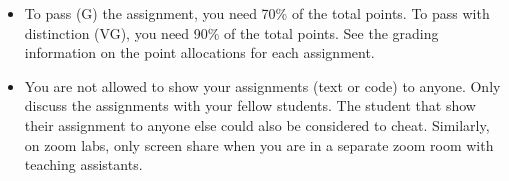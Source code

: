\begin{itemize}
\item To pass (G) the assignment, you need 70\% of the total points. To pass with distinction (VG), you need 90\% of the total points. See the grading information on the point allocations for each assignment.
\item You are not allowed to show your assignments (text or code) to anyone. Only discuss the assignments with your fellow students. The student that show their assignment to anyone else could also be considered to cheat. Similarly, on zoom labs, only screen share when you are in a separate zoom room with teaching assistants.
\end{itemize}


